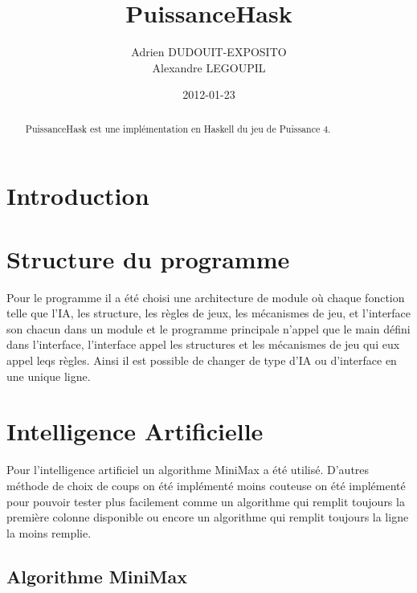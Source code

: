 \documentclass[a4paper]{article}
\title{PuissanceHask}
\author{Adrien DUDOUIT-EXPOSITO\\Alexandre LEGOUPIL}
\date{2012-01-23}
\begin{document}
\ifpdf
{}
\else
{}
\fi

\maketitle


\begin{abstract}
PuissanceHask est une implémentation en Haskell du jeu de Puissance 4.
\end{abstract}

\section{Introduction}

\section{Structure du programme}

Pour le programme il a été choisi une architecture de module où chaque fonction telle que l'IA, les structure, les règles de jeux, les mécanismes de jeu, et l'interface son chacun dans un module et le programme principale n'appel que le main défini dans l'interface, l'interface appel les structures et les mécanismes de jeu qui eux appel leqs règles. Ainsi il est possible de changer de type d'IA ou d'interface en une unique ligne.

\section{Intelligence Artificielle}

Pour l'intelligence artificiel un algorithme MiniMax a été utilisé. D'autres méthode de choix de coups on été implémenté moins couteuse on été implémenté pour pouvoir tester plus facilement comme un algorithme qui remplit toujours la première colonne disponible ou encore un algorithme qui remplit toujours la ligne la moins remplie.

\subsection{Algorithme MiniMax}
\label{alg:minimax}
\end{document}
